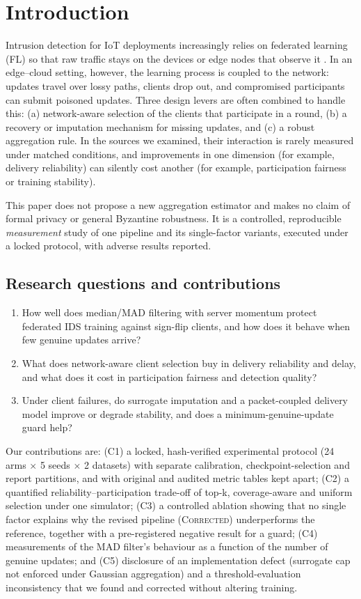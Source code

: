 \documentclass[preprint,12pt,times,numafflabel]{elsarticle}
\newcommand{\Cor}{\textsc{Corrected}}
\begin{document}
\section{Introduction}
Intrusion detection for IoT deployments increasingly relies on federated learning (FL) so that raw traffic stays on the devices or edge nodes that observe it \cite{mcmahan2017fedavg}. In an edge--cloud setting, however, the learning process is coupled to the network: updates travel over lossy paths, clients drop out, and compromised participants can submit poisoned updates. Three design levers are often combined to handle this: (a) network-aware selection of the clients that participate in a round, (b) a recovery or imputation mechanism for missing updates, and (c) a robust aggregation rule. In the sources we examined, their interaction is rarely measured under matched conditions, and improvements in one dimension (for example, delivery reliability) can silently cost another (for example, participation fairness or training stability).

This paper does not propose a new aggregation estimator and makes no claim of formal privacy or general Byzantine robustness. It is a controlled, reproducible \emph{measurement} study of one pipeline and its single-factor variants, executed under a locked protocol, with adverse results reported.

\subsection*{Research questions and contributions}
\begin{enumerate}
\item[\textbf{RQ1}] How well does median/MAD filtering with server momentum protect federated IDS training against sign-flip clients, and how does it behave when few genuine updates arrive?
\item[\textbf{RQ2}] What does network-aware client selection buy in delivery reliability and delay, and what does it cost in participation fairness and detection quality?
\item[\textbf{RQ3}] Under client failures, do surrogate imputation and a packet-coupled delivery model improve or degrade stability, and does a minimum-genuine-update guard help?
\end{enumerate}
Our contributions are: (C1) a locked, hash-verified experimental protocol (24 arms $\times$ 5 seeds $\times$ 2 datasets) with separate calibration, checkpoint-selection and report partitions, and with original and audited metric tables kept apart; (C2) a quantified reliability--participation trade-off of top-k, coverage-aware and uniform selection under one simulator; (C3) a controlled ablation showing that no single factor explains why the revised pipeline (\Cor) underperforms the reference, together with a pre-registered negative result for a guard; (C4) measurements of the MAD filter's behaviour as a function of the number of genuine updates; and (C5) disclosure of an implementation defect (surrogate cap not enforced under Gaussian aggregation) and a threshold-evaluation inconsistency that we found and corrected without altering training.
\end{document}
